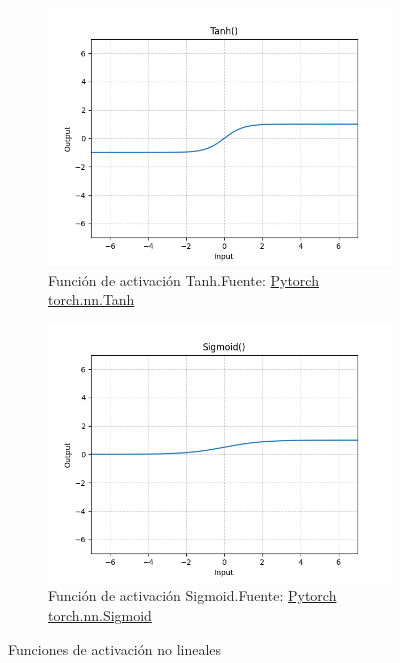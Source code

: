\begin{figure}[H]
    \medskip %
    \begin{subfigure}{.475\linewidth}
        \centering
        \includegraphics[width=0.75\linewidth]{figures/equations/Tanh.png}
        \caption{Función de activación Tanh.\newline{}Fuente: \href{https://pytorch.org/docs/stable/generated/torch.nn.Tanh.html}{Pytorch torch.nn.Tanh}}
        \label{subfig:torch.nn.Tanh}
    \end{subfigure}\hfill %
    \begin{subfigure}{.475\linewidth}
        \centering
        \includegraphics[width=0.75\linewidth]{figures/equations/Sigmoid.png}
        \caption{Función de activación Sigmoid.\newline{}Fuente: \href{https://pytorch.org/docs/stable/generated/torch.nn.Sigmoid.html}{Pytorch torch.nn.Sigmoid}}
        \label{subfig:torch.nn.Sigmoid}
    \end{subfigure}

    \caption{Funciones de activación no lineales}
    \label{fig:equations--Non-linear-Activations}
\end{figure}


